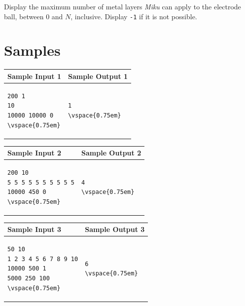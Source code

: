 \documentclass[12pt]{article}
\newenvironment{tabularverbatim}
{\VerbatimEnvironment
\begin{BVerbatim}[baseline=t]}
{\vspace{0.75em}\end{BVerbatim}}
\begin{document}
Display the maximum number of metal layers \textit{Miku} can apply to the electrode ball, between 0 and $N$, inclusive. Display \texttt{-1} if it is not possible.

\section{Samples}

\begin{center}
\def\arraystretch{1.8}%
\begin{tabular}{|p{}|p{}|}
\multicolumn{1}{l}{\textbf{Sample Input 1}} & \multicolumn{1}{l}{\textbf{Sample Output 1}} \\
\hline
\begin{tabularverbatim}
200 1
10
10000 10000 0
\end{tabularverbatim}
&
\begin{tabularverbatim}
1
\end{tabularverbatim}
\\ \hline
\end{tabular}

\vspace{20pt}

\begin{tabular}{|p{}|p{}|}
\hline
Sample Input 2 & Sample Output 2\\
\hline
\begin{tabularverbatim}
200 10
5 5 5 5 5 5 5 5 5 5
10000 450 0
\end{tabularverbatim}
&
\begin{tabularverbatim}
4
\end{tabularverbatim}
\\ \hline
\end{tabular}

\vspace{20pt}

\begin{tabular}{|p{}|p{}|}
\hline
Sample Input 3 & Sample Output 3\\
\hline
\begin{tabularverbatim}
50 10
1 2 3 4 5 6 7 8 9 10
10000 500 1
5000 250 100
\end{tabularverbatim}
&
\begin{tabularverbatim}
6
\end{tabularverbatim}
\\ \hline
\end{tabular}


\end{center}
\end{document}
